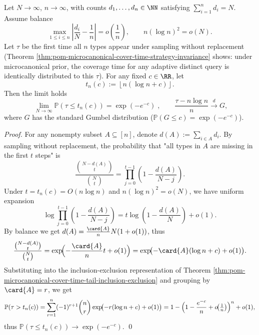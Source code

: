 \begin{theorem}\label{thm:pom-microcanonical-cover-time-gumbel-cutoff}
Let \(N\to\infty\), \(n\to\infty\), with counts \(d_1,\dots,d_n\in\NN\) satisfying \(\sum_{i=1}^n d_i=N\).
Assume balance
\[
\max_{1\le i\le n}\left|\frac{d_i}{N}-\frac{1}{n}\right|=o\!\left(\frac{1}{n}\right),
\qquad
n(\log n)^2=o(N).
\]
Let \(\tau\) be the first time all \(n\) types appear under sampling without replacement (Theorem \ref{thm:pom-microcanonical-cover-time-strategy-invariance} shows: under microcanonical prior, the coverage time for any adaptive distinct query is identically distributed to this \(\tau\)).
For any fixed \(c\in\RR\), let
\[
t_n(c):=\left\lfloor n(\log n+c)\right\rfloor.
\]
Then the limit holds
\[
\boxed{\;
\lim_{N\to\infty}\mathbb{P}(\tau\le t_n(c))=\exp(-e^{-c})\;},
\qquad
\frac{\tau-n\log n}{n}\xrightarrow{d}G,
\]
where \(G\) has the standard Gumbel distribution (\(\mathbb{P}(G\le c)=\exp(-e^{-c})\)).
\end{theorem}
\begin{proof}
For any nonempty subset \(A\subseteq[n]\), denote \(d(A):=\sum_{i\in A}d_i\).
By sampling without replacement, the probability that "all types in \(A\) are missing in the first \(t\) steps" is
\[
\frac{\binom{N-d(A)}{t}}{\binom{N}{t}}
=\prod_{j=0}^{t-1}\left(1-\frac{d(A)}{N-j}\right).
\]
Under \(t=t_n(c)=O(n\log n)\) and \(n(\log n)^2=o(N)\), we have uniform expansion
\[
\log\prod_{j=0}^{t-1}\left(1-\frac{d(A)}{N-j}\right)
=t\log\!\left(1-\frac{d(A)}{N}\right)+o(1).
\]
By balance we get \(d(A)=\frac{\card{A}}{n}N(1+o(1))\), thus
\[
\frac{\binom{N-d(A)}{t}}{\binom{N}{t}}
=\exp\!\Bigl(-\frac{\card{A}}{n}t+o(1)\Bigr)
=\exp\!\bigl(-\card{A}(\log n+c)+o(1)\bigr).
\]
Substituting into the inclusion-exclusion representation of Theorem \ref{thm:pom-microcanonical-cover-time-tail-inclusion-exclusion} and grouping by \(\card{A}=r\), we get
\[
\mathbb{P}(\tau>t_n(c))
=\sum_{r=1}^n(-1)^{r+1}\binom{n}{r}\exp\!\bigl(-r(\log n+c)+o(1)\bigr)
=1-\Bigl(1-\frac{e^{-c}}{n}+o\!\bigl(\tfrac1n\bigr)\Bigr)^n+o(1),
\]
thus \(\mathbb{P}(\tau\le t_n(c))\to \exp(-e^{-c})\). \qed
\end{proof}


